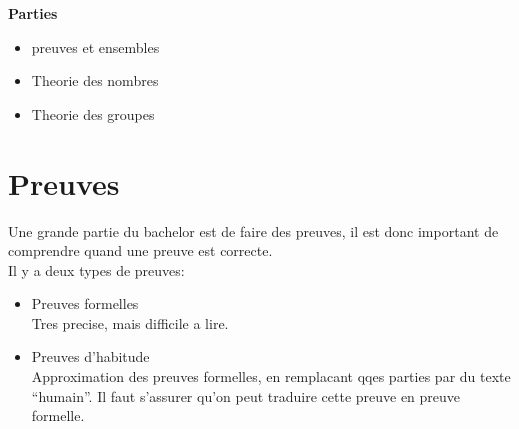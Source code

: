 \documentclass[../main.tex]{subfiles}
\begin{document}
\begin{center}
	\textbf{Parties}
\end{center}

\begin{itemize}
	\item preuves et ensembles\\
	\item Theorie des nombres\\
	\item Theorie des groupes	
\end{itemize}
\section{Preuves}

Une grande partie du bachelor est de faire des preuves, il est donc important de comprendre quand une preuve est correcte.\\

Il y a deux types de preuves:
\begin{itemize}
	\item Preuves formelles\\
		Tres precise, mais difficile a lire.\\
	\item Preuves d'habitude\\
		Approximation des preuves formelles, en remplacant qqes parties par du texte ``humain''.
		Il faut s'assurer qu'on peut traduire cette preuve en preuve formelle.
\end{itemize}
\end{document}
